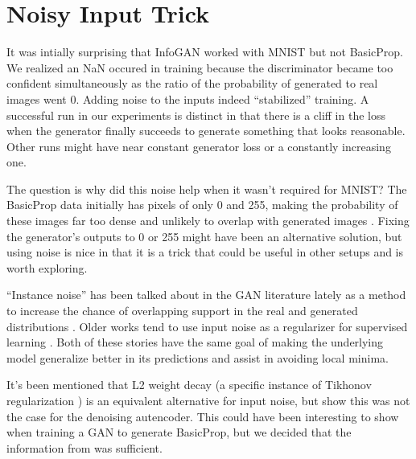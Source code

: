 \documentclass{article}
\begin{document}
\section{Noisy Input Trick}

It was intially surprising that InfoGAN worked with MNIST but not BasicProp. We realized an NaN occured in training because the discriminator became too confident simultaneously as the ratio of the probability of generated to real images went 0. Adding noise to the inputs indeed ``stabilized'' training. A successful run in our experiments is distinct in that there is a cliff in the loss when the generator finally succeeds to generate something that looks reasonable. Other runs might have near constant generator loss or a constantly increasing one.

The question is why did this noise help when it wasn't required for MNIST? The BasicProp data initially has pixels of only 0 and 255, making the probability of these images far too dense and unlikely to overlap with generated images \cite{instancenoise2016}. Fixing the generator's outputs to 0 or 255 might have been an alternative solution, but using noise is nice in that it is a trick that could be useful in other setups and is worth exploring.

``Instance noise'' has been talked about in the GAN literature lately as a method to increase the chance of overlapping support in the real and generated distributions \cite{instancenoise2016,howtotrainagan2016,arjovskygan}. Older works tend to use input noise as a regularizer for supervised learning \cite{von1988factors, holmstrom1992using}. Both of these stories have the same goal of making the underlying model generalize better in its predictions and assist in avoiding local minima.

It's been mentioned that L2 weight decay (a specific instance of Tikhonov regularization \cite{bishop1995training}) is an equivalent alternative for input noise, but \cite{VincentBengioStackedAE} show this was not the case for the denoising autencoder. This could have been interesting to show when training a GAN to generate BasicProp, but we decided that the information from \cite{VincentBengioStackedAE} was sufficient.
\end{document}
